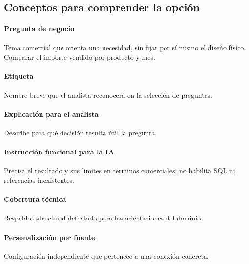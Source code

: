 \subsection{Conceptos para comprender la opción}
\paragraph{Pregunta de negocio} Tema comercial que orienta una necesidad, sin fijar por sí mismo el diseño físico. Comparar el importe vendido por producto y mes.

\paragraph{Etiqueta} Nombre breve que el analista reconocerá en la selección de preguntas.

\paragraph{Explicación para el analista} Describe para qué decisión resulta útil la pregunta.

\paragraph{Instrucción funcional para la IA} Precisa el resultado y sus límites en términos comerciales; no habilita SQL ni referencias inexistentes.

\paragraph{Cobertura técnica} Respaldo estructural detectado para las orientaciones del dominio.

\paragraph{Personalización por fuente} Configuración independiente que pertenece a una conexión concreta.

